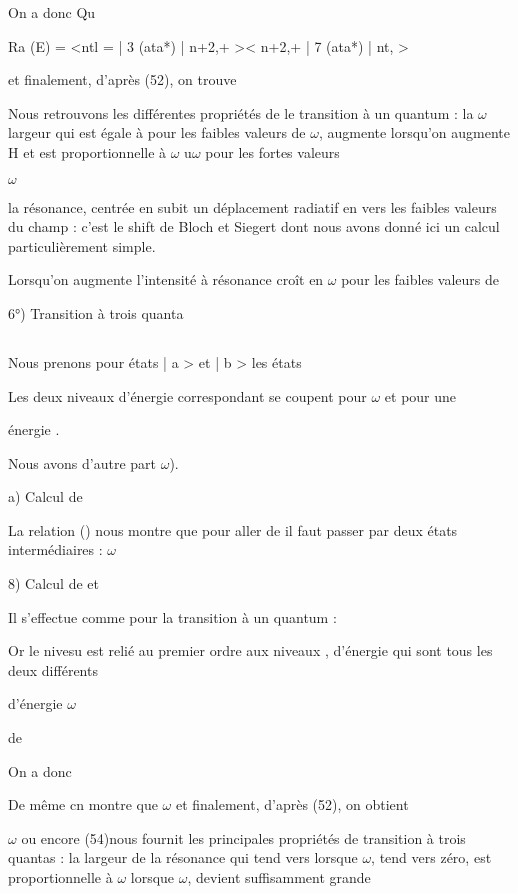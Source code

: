 On a donc
Qu

Ra (E) = <ntl = | 3 (ata*) | n+2,+ >< n+2,+ | 7 (ata*) | nt, >

et finalement, d'après (52), on trouve

Nous retrouvons les différentes propriétés de le transition à un quantum : la
$\omega$
largeur qui est égale à  pour les faibles valeurs de $\omega$, augmente lorsqu'on
augmente H et est proportionnelle à $\omega$ u$\omega$ pour les fortes valeurs


$\omega$

la résonance, centrée en  subit un déplacement radiatif en
 vers les faibles valeurs du champ : c'est le shift de Bloch et Siegert
dont nous avons donné ici un calcul particulièrement simple.

Lorsqu'on augmente  l'intensité à résonance croît en $\omega$ pour
les faibles valeurs de 

6°) Transition à trois quanta
\subsection{}%

Nous prenons pour états | a > et | b > les états

Les deux niveaux d'énergie correspondant se coupent pour $\omega$ et pour une

énergie .

Nous avons d'autre part $\omega$).

a) Calcul de 

La relation () nous montre que pour aller de 
il faut passer par deux états intermédiaires :
$\omega$

8) Calcul de  et 

Il s'effectue comme pour la transition à un quantum :


Or le nivesu  est relié au premier ordre aux
niveaux , d'énergie  qui sont tous les deux différents

d'énergie $\omega$

de

On a donc

De même cn montre que
$\omega$
et finalement, d'après (52), on obtient

$\omega$
ou encore
(54)nous fournit les principales propriétés de  transition à trois quantas :
la largeur de la résonance  qui tend vers  lorsque
$\omega$, tend vers zéro, est proportionnelle à $\omega$  lorsque $\omega$, devient suffisamment grande


